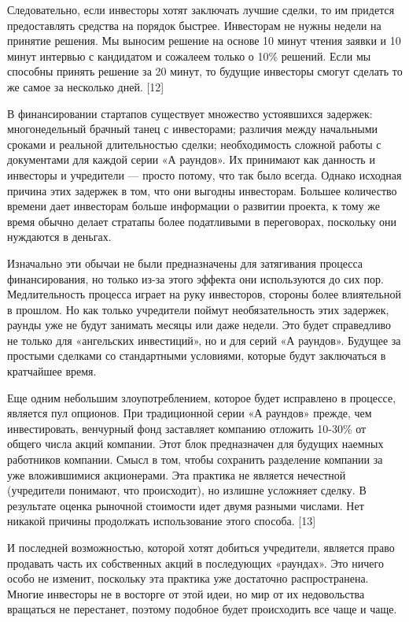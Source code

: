 \documentclass[ebook,12pt,oneside,openany]{memoir}
\begin{document}
Следовательно, если инвесторы хотят заключать лучшие сделки, то им
придется предоставлять средства на порядок быстрее. Инвесторам не
нужны недели на принятие решения. Мы выносим решение на основе 10
минут чтения заявки и 10 минут интервью с кандидатом и сожалеем только
о 10\% решений. Если мы способны принять решение за 20 минут, то
будущие инвесторы смогут сделать то же самое за несколько дней. [12]

В финансировании стартапов существует множество устоявшихся задержек:
многонедельный брачный танец с инвесторами; различия между начальными
сроками и реальной длительностью сделки; необходимость сложной работы
с документами для каждой серии «А раундов». Их принимают как данность
и инвесторы и учредители — просто потому, что так было всегда. Однако
исходная причина этих задержек в том, что они выгодны инвесторам.
Большее количество времени дает инвесторам больше информации о
развитии проекта, к тому же время обычно делает стратапы более
податливыми в переговорах, поскольку они нуждаются в деньгах.

Изначально эти обычаи не были предназначены для затягивания процесса
финансирования, но только из-за этого эффекта они используются до сих
пор. Медлительность процесса играет на руку инвесторов, стороны более
влиятельной в прошлом. Но как только учредители поймут
необязательность этих задержек, раунды уже не будут занимать месяцы
или даже недели. Это будет справедливо не только для «ангельских
инвестиций», но и для серий «А раундов». Будущее за простыми сделками
со стандартными условиями, которые будут заключаться в кратчайшее
время.

Еще одним небольшим злоупотреблением, которое будет исправлено в
процессе, является пул опционов. При традиционной серии «А раундов»
прежде, чем инвестировать, венчурный фонд заставляет компанию отложить
10-30\% от общего числа акций компании. Этот блок предназначен для
будущих наемных работников компании. Смысл в том, чтобы сохранить
разделение компании за уже вложившимися акционерами. Эта практика не
является нечестной (учредители понимают, что происходит), но излишне
усложняет сделку. В результате оценка рыночной стоимости идет двумя
разными числами. Нет никакой причины продолжать использование этого
способа. [13]

И последней возможностью, которой хотят добиться учредители, является
право продавать часть их собственных акций в последующих «раундах».
Это ничего особо не изменит, поскольку эта практика уже достаточно
распространена. Многие инвесторы не в восторге от этой идеи, но мир от
их недовольства вращаться не перестанет, поэтому подобное будет
происходить все чаще и чаще.
\end{document}
